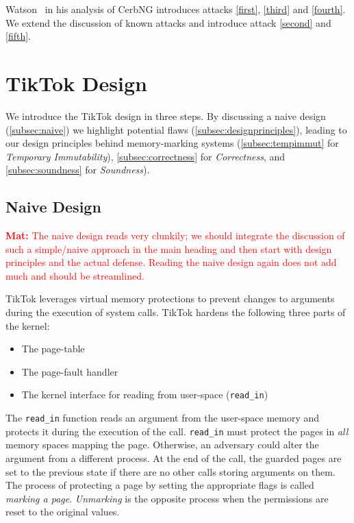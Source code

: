 \documentclass[conference]{IEEEtran}
\newcommand{\mat}[1]{\textcolor{red}{\textbf{Mat:} #1}}
\newcommand{\sysname}{TikTok}
\begin{document}
Watson~\cite{watson2007exploiting} in his analysis of CerbNG introduces attacks
\ref{first}, \ref{third} and \ref{fourth}. We extend the discussion of known
attacks and introduce attack \ref{second} and \ref{fifth}.

\section{\sysname{} Design}
\label{sec:design}

We introduce the \sysname{} design in three steps.  By discussing a naive
design (\autoref{subsec:naive}) we highlight potential flaws
(\autoref{subsec:designprinciples}), leading to our design principles behind
memory-marking systems (\autoref{subsec:tempimmut} for \emph{Temporary
Immutability}), \autoref{subsec:correctness} for \emph{Correctness}, and
\autoref{subsec:soundness} for \emph{Soundness}).

\subsection{Naive Design}
\label{subsec:naive}
\mat{The naive design reads very clunkily; we should integrate the discussion of
such a simple/naive approach in the main heading and then start with design
principles and the actual defense. Reading the naive design again does not add
much and should be streamlined.}

\sysname{} leverages virtual memory protections to
prevent changes to arguments during the execution of system calls.
\sysname{} hardens the following three parts of the kernel:

\begin{itemize}
\item The page-table
\item The page-fault handler
\item The kernel interface for reading from user-space (\texttt{read\_in})
\end{itemize}

The \texttt{read\_in} function reads an argument from the user-space memory and
protects it during the execution of the call. \texttt{read\_in} must protect the
pages in \emph{all} memory spaces mapping the page. Otherwise, an adversary
could alter the argument from a different process. At the end of the call, the
guarded pages are set to the previous state if there are no other calls storing
arguments on them. The process of protecting a page by setting the appropriate
flags is called \emph{marking a page}. \emph{Unmarking} is the opposite process
when the permissions are reset to the original values.
\end{document}
